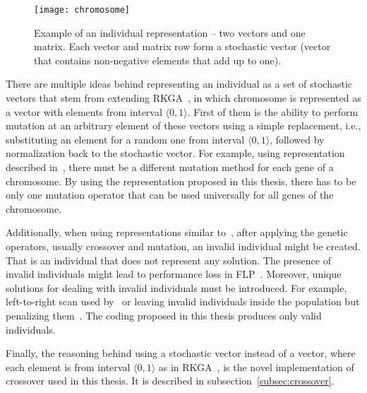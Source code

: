 \begin{figure}[htp]
    \texttt{[image: chromosome]}
    \caption[Example of an individual representation]{
        Example of an individual representation – two vectors and one matrix.
        Each vector and matrix row form a stochastic vector (vector that contains non-negative elements that add up to one).
    }
    \label{fig:chromosome}
\end{figure}

There are multiple ideas behind representing an individual as a set of stochastic vectors that stem
from extending RKGA~\cite{beanGeneticAlgorithmsRandom1994}, in which chromosome is represented as a vector with elements from interval $\langle0,1\rangle$.
First of them is the ability to perform mutation at an arbitrary element of these vectors using
a simple replacement, i.e., substituting an element for a random one from interval $\langle0,1 \rangle$,
followed by normalization back to the stochastic vector.
For example, using representation described in~\cite{friedrichIntegratedSlicingTree2018, riponAdaptiveVariableNeighborhood2013},
there must be a different mutation method for each gene of a chromosome.
By using the representation proposed in this thesis, there has to be only one mutation operator that can be used universally
for all genes of the chromosome.

Additionally, when using representations similar to~\cite{friedrichIntegratedSlicingTree2018, riponAdaptiveVariableNeighborhood2013}, after applying the genetic operators, usually crossover and mutation, an invalid individual might be created.
That is an individual that does not represent any solution.
The presence of invalid individuals might lead to performance loss in FLP~\cite{liuMultiimprovedGeneticAlgorithm2012}.
Moreover, unique solutions for dealing with invalid individuals must be introduced.
For example, left-to-right scan used by~\cite{hwangGeneticAlgorithmApproach2009, kandasamyEffectiveLocationMicro2020} or leaving invalid individuals inside the population but penalizing them~\cite{hwangGeneticAlgorithmApproach2009}.
The coding proposed in this thesis produces only valid individuals.

Finally, the reasoning behind using a stochastic vector instead of a vector, where each element is from interval $\langle0,1\rangle$ as in RKGA~\cite{beanGeneticAlgorithmsRandom1994}, is the novel implementation of crossover used in this thesis.
It is described in subsection~\ref{subsec:crossover}.
